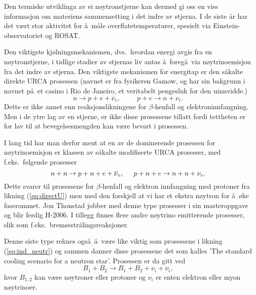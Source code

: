Den termiske utviklinga av ei n\o ytronstjerne kan dermed
gi oss en viss
informasjon om materiens sammensetting i det indre av 
stjerna. I de siste \aa r har det v\ae rt stor aktivitet
for \aa\ m\aa le overflatetemperaturer, spesielt via
Einstein-observatoriet og ROSAT.

Den viktigste kj\o lningsmekanismen, dvs.\ hvordan energi
avgis fra en n\o ytronstjerne, i tidlige stadier av stjernas liv  
antas \aa\ foreg\aa\ via n\o ytrinoemisjon fra det indre av
stjerna.
Den viktigste mekanismen for energitap er den s\aa kalte
direkte URCA prosessen (navnet er fra fysikeren Gamow,
og har sin bakgrunn i navnet p\aa\ et casino i Rio de Janeiro,
et veritabelt pengesluk for den uinnvidde.)
\begin{equation}
    n\rightarrow p +e +\overline{\nu}_e, \hspace{1cm} p+e \rightarrow
    n+\nu_e .
    \label{eq:directU}
\end{equation}
Dette er ikke annet enn reaksjonslikningene for $\beta$-henfall og
elektroninnfangning.
Men i  de ytre lag av en stjerne, 
er ikke disse prosessene tillatt fordi tettheten er for lav 
til at bevegelsesmengden kan v\ae re bevart i prosessen.  

I lang tid har man derfor ment at en av de dominerende prosessen for 
n\o ytrinoemisjon er klassen av s\aa kalte
modifiserte URCA prosesser, med f.eks.\ f\o lgende prosesser
\begin{equation}
    n+n\rightarrow p+n +e +\overline{\nu}_e,
    \hspace{0.5cm} p+n+e \rightarrow
    n+n+\nu_e .
    \label{eq:ind_neutr}
\end{equation}
Dette svarer til prosessene for  
$\beta$-henfall og elektron innfangning  med  protoner 
fra likning (\ref{eq:directU}) men med den forskjell at vi har 
et ekstra n\o ytron for \aa\ \o ke faserommet.
Jon Thonstad jobber med denne type prosesser i sin masteroppgave
og blir ferdig H-2006.
I tillegg finnes flere andre n\o ytrino emitterende 
prosesser, slik som f.eks.\
bremsestr\aa lingsreaksjoner.

Denne siste type reknes ogs\aa\ \aa\ v\ae re like viktig som prosessene
i likning (\ref{eq:ind_neutr}) og sammen danner disse prosessene 
det som kalles 'The standard
cooling scenario for a neutron star'. 
Prosessen er da gitt ved
\begin{equation}
    B_1+B_2\rightarrow B_1+B_2 +\nu_i +\overline{\nu}_i,
    \label{eq:vv}
\end{equation}
hvor $B_{1,2}$ kan v\ae re n\o ytroner eller protoner og $\nu_i$
er enten elektron eller myon n\o ytrinoer. 


